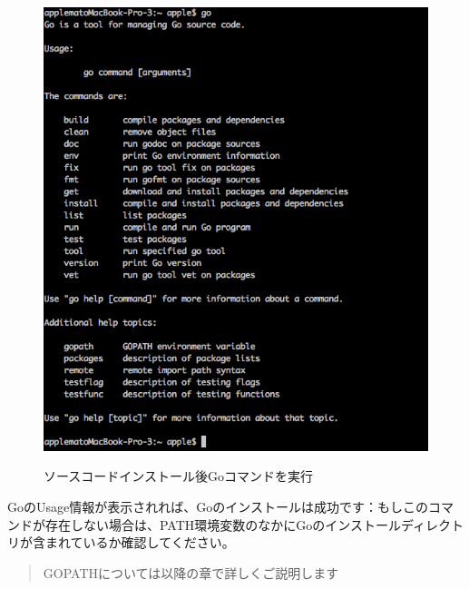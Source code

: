 \begin{figure}[H]
\includegraphics[width=14cm]{1.1.mac.png}
\label{図1.1}
\caption{ソースコードインストール後Goコマンドを実行}
\end{figure}

GoのUsage情報が表示されれば、Goのインストールは成功です：もしこのコマンドが存在しない場合は、PATH環境変数のなかにGoのインストールディレクトリが含まれているか確認してください。

\begin{quote}
  GOPATHについては以降の章で詳しくご説明します
\end{quote}



